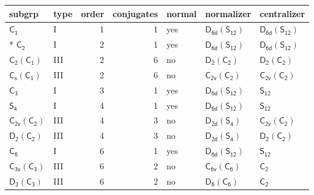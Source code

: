 \documentclass[10pt,a4paper]{article}
\numberwithin{equation}{section}
\newcommand{\grp}[1]{\mathsf{#1}}
\begin{document}
{\small\begin{longtable}{@{}llrrlll@{}}\toprule
subgrp & type & order & conjugates & normal & normalizer & centralizer\\\midrule\endhead
\bottomrule\endfoot\endlastfoot
\href{../../../rotation/data/pdf/C1.pdf}{$\grp{C_{1}}$} & I & 1 & 1 & yes & \href{D6d-S12.pdf}{$\grp{D_{6d}}(\grp{S_{12}})$} & \href{D6d-S12.pdf}{$\grp{D_{6d}}(\grp{S_{12}})$}\\*
\href{../../../rotation/data/pdf/C2.pdf}{$\grp{C_{2}}$} & I & 2 & 1 & yes & \href{D6d-S12.pdf}{$\grp{D_{6d}}(\grp{S_{12}})$} & \href{D6d-S12.pdf}{$\grp{D_{6d}}(\grp{S_{12}})$}\\
\href{C2-C1.pdf}{$\grp{C_{2}}(\grp{C_{1}})$} & III & 2 & 6 & no & \href{D2-C2.pdf}{$\grp{D_{2}}(\grp{C_{2}})$} & \href{D2-C2.pdf}{$\grp{D_{2}}(\grp{C_{2}})$}\\
\href{C1v-C1.pdf}{$\grp{C_{s}}(\grp{C_{1}})$} & III & 2 & 6 & no & \href{C2v-C2.pdf}{$\grp{C_{2v}}(\grp{C_{2}})$} & \href{C2v-C2.pdf}{$\grp{C_{2v}}(\grp{C_{2}})$}\\
\href{../../../rotation/data/pdf/C3.pdf}{$\grp{C_{3}}$} & I & 3 & 1 & yes & \href{D6d-S12.pdf}{$\grp{D_{6d}}(\grp{S_{12}})$} & \href{../../../rotation/data/pdf/S12.pdf}{$\grp{S_{12}}$}\\
\href{../../../rotation/data/pdf/S4.pdf}{$\grp{S_{4}}$} & I & 4 & 1 & yes & \href{D6d-S12.pdf}{$\grp{D_{6d}}(\grp{S_{12}})$} & \href{../../../rotation/data/pdf/S12.pdf}{$\grp{S_{12}}$}\\
\href{C2v-C2.pdf}{$\grp{C_{2v}}(\grp{C_{2}})$} & III & 4 & 3 & no & \href{D2d-S4.pdf}{$\grp{D_{2d}}(\grp{S_{4}})$} & \href{C2v-C2.pdf}{$\grp{C_{2v}}(\grp{C_{2}})$}\\
\href{D2-C2.pdf}{$\grp{D_{2}}(\grp{C_{2}})$} & III & 4 & 3 & no & \href{D2d-S4.pdf}{$\grp{D_{2d}}(\grp{S_{4}})$} & \href{D2-C2.pdf}{$\grp{D_{2}}(\grp{C_{2}})$}\\
\href{../../../rotation/data/pdf/C6.pdf}{$\grp{C_{6}}$} & I & 6 & 1 & yes & \href{D6d-S12.pdf}{$\grp{D_{6d}}(\grp{S_{12}})$} & \href{../../../rotation/data/pdf/S12.pdf}{$\grp{S_{12}}$}\\
\href{C3v-C3.pdf}{$\grp{C_{3v}}(\grp{C_{3}})$} & III & 6 & 2 & no & \href{C6v-C6.pdf}{$\grp{C_{6v}}(\grp{C_{6}})$} & \href{../../../rotation/data/pdf/C2.pdf}{$\grp{C_{2}}$}\\
\href{D3-C3.pdf}{$\grp{D_{3}}(\grp{C_{3}})$} & III & 6 & 2 & no & \href{D6-C6.pdf}{$\grp{D_{6}}(\grp{C_{6}})$} & \href{../../../rotation/data/pdf/C2.pdf}{$\grp{C_{2}}$}\\

\end{longtable}}
\end{document}

